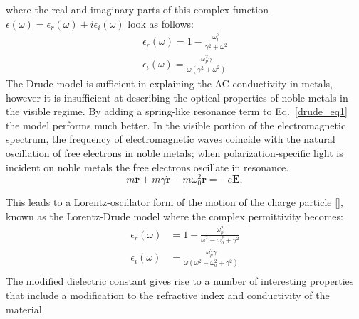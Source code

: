 where the real and imaginary parts of this complex function $\epsilon(\omega) = \epsilon_r(\omega)+i\epsilon_i(\omega)$ look as follows:
\begin{equation}
\begin{aligned}
\epsilon_r(\omega) = 1 - \frac{\omega_p^2}{\gamma^2+\omega^2}\\
\epsilon_i(\omega) = \frac{\omega_p^2\gamma}{\omega(\gamma^2+\omega^2)}
\end{aligned}
\end{equation}
The Drude model is sufficient in explaining the AC conductivity in metals, however it is insufficient at describing the optical properties of noble metals in the visible regime. By adding a spring-like resonance term to Eq.~\ref{drude_eq1} the model performs much better. In the visible portion of the electromagnetic spectrum, the frequency of electromagnetic waves coincide with the natural oscillation of free electrons in noble metals; when polarization-specific light is incident on noble metals the free electrons oscillate in resonance. 
\begin{equation}
m\ddot{\mathbf{r}}+m\gamma\dot{\mathbf{r}}-m\omega_0^2\mathbf{r} = -e\mathbf{E},
\label{drude_eq2}
\end{equation}

This leads to a Lorentz-oscillator form of the motion of the charge particle [\cite{Vial}], known as the Lorentz-Drude model where the complex permittivity becomes:
\begin{equation}
\begin{split}
\epsilon_r(\omega) &= 1-\frac{\omega_p^2}{\omega^2-\omega_0^2+\gamma^2}\\
\epsilon_i(\omega) &= \frac{\omega_p^2\gamma}{\omega(\omega^2-\omega_0^2+\gamma^2)}\\
\end{split}
\label{eps_m}
\end{equation}
The modified dielectric constant gives rise to a number of interesting properties that include a modification to the refractive index and conductivity of the material.

